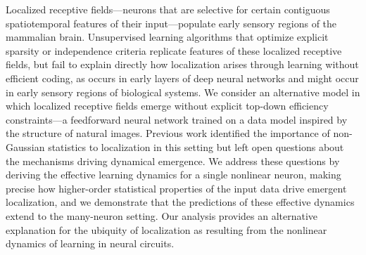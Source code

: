 Localized receptive fields---neurons that are selective for certain contiguous spatiotemporal features of their input---populate early sensory regions of the mammalian brain. Unsupervised learning algorithms that optimize explicit sparsity or independence criteria replicate features of these localized receptive fields, but fail to explain directly how localization arises through learning without efficient coding, as occurs in early layers of deep neural networks and might occur in early sensory regions of biological systems. We consider an alternative model in which localized receptive fields emerge without explicit top-down efficiency constraints---a feedforward neural network trained on a data model inspired by the structure of natural images. Previous work identified the importance of non-Gaussian statistics to localization in this setting but left open questions about the mechanisms driving dynamical emergence. We address these questions by deriving the effective learning dynamics for a single nonlinear neuron, making precise how higher-order statistical properties of the input data drive emergent localization, and we demonstrate that the predictions of these effective dynamics extend to the many-neuron setting. Our analysis provides an alternative explanation for the ubiquity of localization as resulting from the nonlinear dynamics of learning in neural circuits.\smash{\footnotemark}
